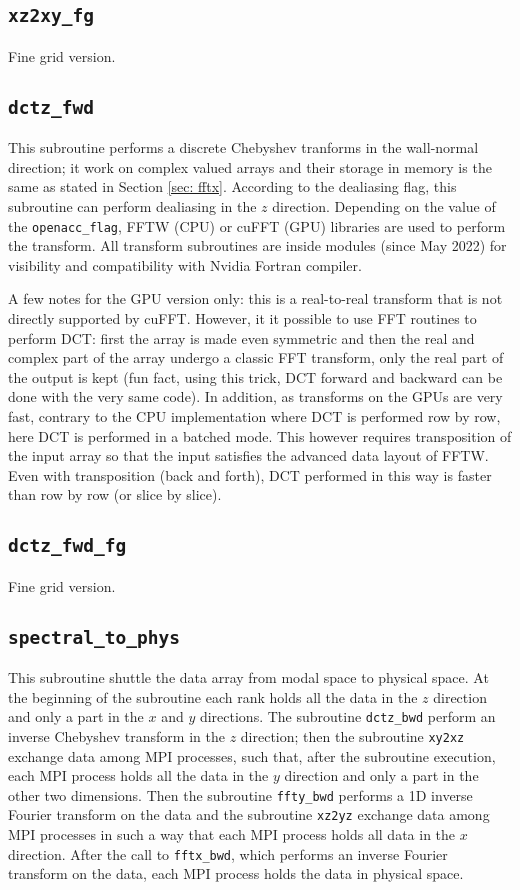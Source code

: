 \subsection{\texttt{xz2xy\_fg}}
Fine grid version.

\subsection{\texttt{dctz\_fwd}}
This subroutine performs a discrete Chebyshev tranforms in the wall-normal direction; it work on complex valued arrays and their storage in memory is the same as stated in Section \ref{sec: fftx}. 
According to the dealiasing flag, this subroutine can perform dealiasing in the $z$ direction.
Depending on the value of the \texttt{openacc\_flag}, FFTW (CPU) or cuFFT (GPU) libraries are used to perform the transform.
All transform subroutines are inside modules (since May 2022) for visibility and compatibility with Nvidia Fortran compiler.

A few notes for the GPU version only: this is a real-to-real transform that is not directly supported by cuFFT. 
However, it it possible to use FFT routines to perform DCT: first the array is made even symmetric and then the real and complex part of the array undergo a classic FFT transform, only the real part of the output is kept (fun fact, using this trick, DCT forward and backward can be done with the very same code).
In addition, as transforms on the GPUs are very fast, contrary to the CPU implementation where DCT is performed row by row, here DCT is performed in a batched mode. 
This however requires transposition of the input array so that the input satisfies the advanced data layout of FFTW.
Even with transposition (back and forth), DCT performed in this way is faster than row by row (or slice by slice). 

\subsection{\texttt{dctz\_fwd\_fg}}
Fine grid version.


\subsection{\texttt{spectral\_to\_phys}}
This subroutine shuttle the data array from modal space to physical space. At the beginning of the subroutine each rank holds all the data in the $z$ direction and only a part in the $x$ and $y$ directions. The subroutine \texttt{dctz\_bwd} perform an inverse Chebyshev transform in the $z$ direction; then the subroutine \texttt{xy2xz} exchange data among MPI processes, such that, after the subroutine execution, each MPI process holds all the data in the $y$ direction and only a part in the other two dimensions. 
Then the subroutine \texttt{ffty\_bwd} performs a 1D inverse Fourier transform on the data and the subroutine \texttt{xz2yz} exchange data among MPI processes in such a way that each MPI process holds all data in the $x$ direction. After the call to \texttt{fftx\_bwd}, which performs an inverse Fourier transform on the data, each MPI process holds the data in physical space.

